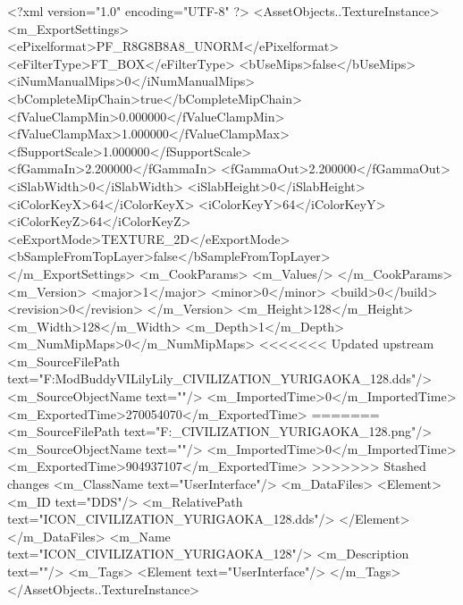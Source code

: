 <?xml version="1.0" encoding="UTF-8" ?>
<AssetObjects..TextureInstance>
	<m_ExportSettings>
		<ePixelformat>PF_R8G8B8A8_UNORM</ePixelformat>
		<eFilterType>FT_BOX</eFilterType>
		<bUseMips>false</bUseMips>
		<iNumManualMips>0</iNumManualMips>
		<bCompleteMipChain>true</bCompleteMipChain>
		<fValueClampMin>0.000000</fValueClampMin>
		<fValueClampMax>1.000000</fValueClampMax>
		<fSupportScale>1.000000</fSupportScale>
		<fGammaIn>2.200000</fGammaIn>
		<fGammaOut>2.200000</fGammaOut>
		<iSlabWidth>0</iSlabWidth>
		<iSlabHeight>0</iSlabHeight>
		<iColorKeyX>64</iColorKeyX>
		<iColorKeyY>64</iColorKeyY>
		<iColorKeyZ>64</iColorKeyZ>
		<eExportMode>TEXTURE_2D</eExportMode>
		<bSampleFromTopLayer>false</bSampleFromTopLayer>
	</m_ExportSettings>
	<m_CookParams>
		<m_Values/>
	</m_CookParams>
	<m_Version>
		<major>1</major>
		<minor>0</minor>
		<build>0</build>
		<revision>0</revision>
	</m_Version>
	<m_Height>128</m_Height>
	<m_Width>128</m_Width>
	<m_Depth>1</m_Depth>
	<m_NumMipMaps>0</m_NumMipMaps>
<<<<<<< Updated upstream
	<m_SourceFilePath text="F:\1\Firaxis ModBuddy\Civilization VI\Assault Lily\Assault Lily\Textures\ICON_CIVILIZATION_YURIGAOKA_128.dds"/>
	<m_SourceObjectName text=""/>
	<m_ImportedTime>0</m_ImportedTime>
	<m_ExportedTime>270054070</m_ExportedTime>
=======
	<m_SourceFilePath text="F:\DT\lilyimages\all\ICON_CIVILIZATION_YURIGAOKA_128.png"/>
	<m_SourceObjectName text=""/>
	<m_ImportedTime>0</m_ImportedTime>
	<m_ExportedTime>904937107</m_ExportedTime>
>>>>>>> Stashed changes
	<m_ClassName text="UserInterface"/>
	<m_DataFiles>
		<Element>
			<m_ID text="DDS"/>
			<m_RelativePath text="ICON_CIVILIZATION_YURIGAOKA_128.dds"/>
		</Element>
	</m_DataFiles>
	<m_Name text="ICON_CIVILIZATION_YURIGAOKA_128"/>
	<m_Description text=""/>
	<m_Tags>
		<Element text="UserInterface"/>
	</m_Tags>
</AssetObjects..TextureInstance>

